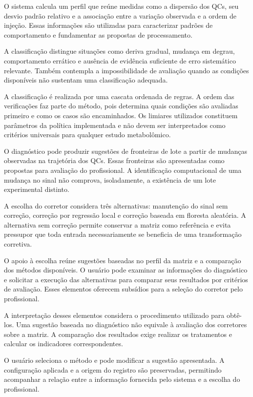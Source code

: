 O sistema calcula um perfil que reúne medidas como a dispersão dos QCs, seu desvio padrão relativo e a associação entre a variação observada e a ordem de injeção. Essas informações são utilizadas para caracterizar padrões de comportamento e fundamentar as propostas de processamento.

A classificação distingue situações como deriva gradual, mudança em degrau, comportamento errático e ausência de evidência suficiente de erro sistemático relevante. Também contempla a impossibilidade de avaliação quando as condições disponíveis não sustentam uma classificação adequada.

A classificação é realizada por uma cascata ordenada de regras. A ordem das verificações faz parte do método, pois determina quais condições são avaliadas primeiro e como os casos são encaminhados. Os limiares utilizados constituem parâmetros da política implementada e não devem ser interpretados como critérios universais para qualquer estudo metabolômico.

O diagnóstico pode produzir sugestões de fronteiras de lote a partir de mudanças observadas na trajetória dos QCs. Essas fronteiras são apresentadas como propostas para avaliação do profissional. A identificação computacional de uma mudança no sinal não comprova, isoladamente, a existência de um lote experimental distinto.

A escolha do corretor considera três alternativas: manutenção do sinal sem correção, correção por regressão local e correção baseada em floresta aleatória. A alternativa sem correção permite conservar a matriz como referência e evita pressupor que toda entrada necessariamente se beneficia de uma transformação corretiva.

O apoio à escolha reúne sugestões baseadas no perfil da matriz e a comparação dos métodos disponíveis. O usuário pode examinar as informações do diagnóstico e solicitar a execução das alternativas para comparar seus resultados por critérios de avaliação. Esses elementos oferecem subsídios para a seleção do corretor pelo profissional.

A interpretação desses elementos considera o procedimento utilizado para obtê-los. Uma sugestão baseada no diagnóstico não equivale à avaliação dos corretores sobre a matriz. A comparação dos resultados exige realizar os tratamentos e calcular os indicadores correspondentes.

O usuário seleciona o método e pode modificar a sugestão apresentada. A configuração aplicada e a origem do registro são preservadas, permitindo acompanhar a relação entre a informação fornecida pelo sistema e a escolha do profissional.

